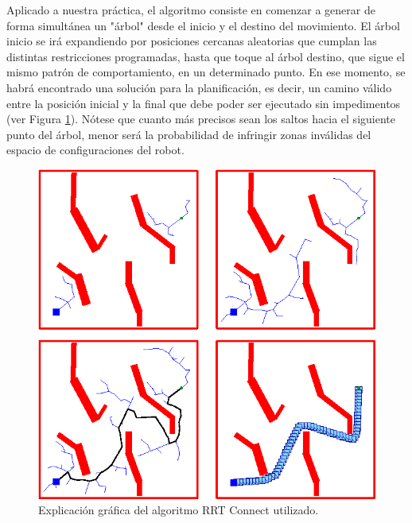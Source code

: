 \documentclass[12pt,spanish,chapterprefix, numbers=noenddot]{book}
\numberwithin{equation}{section}
\numberwithin{figure}{section}
\begin{document}
Aplicado a nuestra práctica, el algoritmo consiste en comenzar a generar de forma simultánea un "árbol"  desde el inicio y el destino del movimiento. El árbol inicio se irá expandiendo por posiciones cercanas aleatorias que cumplan las distintas restricciones programadas, hasta que toque al árbol destino, que sigue el mismo patrón de comportamiento, en un determinado punto. En ese momento, se habrá encontrado una solución para la planificación, es decir, un camino válido entre la posición inicial y la final que debe poder ser ejecutado sin impedimentos (ver Figura \ref{fig:rrtConnect}). Nótese que cuanto más precisos sean los saltos hacia el siguiente punto del árbol, menor será la probabilidad de infringir zonas inválidas del espacio de configuraciones del robot. 



\begin{figure}[hbt!]
\centering
\includegraphics[width=12cm]{Figs/rrtConnect.png}
\par
\caption{\label{fig:rrtConnect}Explicación gráfica del algoritmo RRT Connect utilizado.}
\end{figure}
\end{document}
